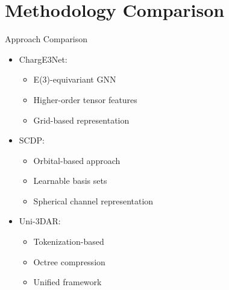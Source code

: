 \section{Methodology Comparison}

\begin{frame}{Approach Comparison}
    \begin{itemize}
        \item ChargE3Net:
        \begin{itemize}
            \item E(3)-equivariant GNN
            \item Higher-order tensor features
            \item Grid-based representation
        \end{itemize}
        \item SCDP:
        \begin{itemize}
            \item Orbital-based approach
            \item Learnable basis sets
            \item Spherical channel representation
        \end{itemize}
        \item Uni-3DAR:
        \begin{itemize}
            \item Tokenization-based
            \item Octree compression
            \item Unified framework
        \end{itemize}
    \end{itemize}
\end{frame}

